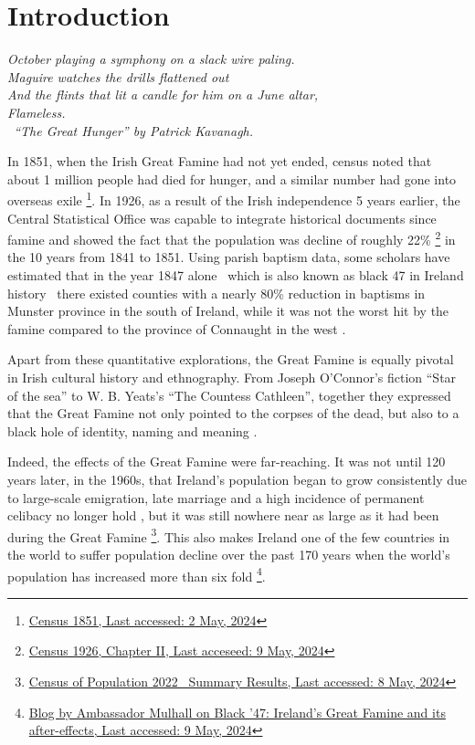 \chapter{Introduction}
\textit{October playing a symphony on a slack wire paling.\\
Maguire watches the drills flattened out\\
And the flints that lit a candle for him on a June altar,\\
Flameless. \\
\textemdash\ ``The Great Hunger'' by Patrick Kavanagh.} \citep{Kavanagh_Quinn_2006a}
\vspace{.2cm}

In 1851, when the Irish Great Famine had not yet ended, census noted that about 1 million people had died for hunger, and a similar number had gone into overseas exile
\footnote{
	\href{https://www.cso.ie/en/statistics/historicalreports/census1851/}{Census 1851, Last accessed: 2 May, 2024}
}. In 1926, as a result of the Irish independence 5 years earlier, the Central Statistical Office was capable to integrate historical documents since famine and showed the fact that the population was decline of roughly 22\%
\footnote{
	\href{https://www.cso.ie/en/media/csoie/census/census1926results/volume10/C_1926_V10_Chapter_II.pdf}{Census 1926, Chapter II, Last acceseed: 9 May, 2024}
} in the 10 years from 1841 to 1851. Using parish baptism data, some scholars have estimated that in the year 1847 alone \textendash\ which is also known as black 47 in Ireland history \textendash\ there existed counties with a nearly 80\% reduction in baptisms in Munster province in the south of Ireland, while it was not the worst hit by the famine compared to the province of Connaught in the west \citep{cousens1960regional}. 

Apart from these quantitative explorations, the Great Famine is equally pivotal in Irish cultural history and ethnography. From Joseph O'Connor's fiction ``Star of the sea'' to W. B. Yeats's ``The Countess Cathleen'', together they expressed that the Great Famine not only pointed to the corpses of the dead, but also to a black hole of identity, naming and meaning \citep{luchen41naming}. 

Indeed, the effects of the Great Famine were far-reaching. It was not until 120 years later, in the 1960s, that Ireland's population began to grow consistently due to large-scale emigration, late marriage and a high incidence of permanent celibacy no longer hold \citep{grada1979population}, but it was still nowhere near as large as it had been during the Great Famine
\footnote{
	\href{https://www.cso.ie/en/releasesandpublications/ep/p-cpsr/censusofpopulation2022-summaryresults/populationchanges/}
	{Census of Population 2022 \textendash\ Summary Results, Last accessed: 8 May, 2024}
}.
This also makes Ireland one of the few countries in the world to suffer population decline over the past 170 years when the world's population has increased more than six fold
\footnote{
	\href{https://www.dfa.ie/irish-embassy/usa/about-us/ambassador/ambassadors-blog/black47irelandsgreatfamineanditsafter-effects/}
	{Blog by Ambassador Mulhall on Black '47: Ireland's Great Famine and its after-effects, Last accessed: 9 May, 2024}
}.

